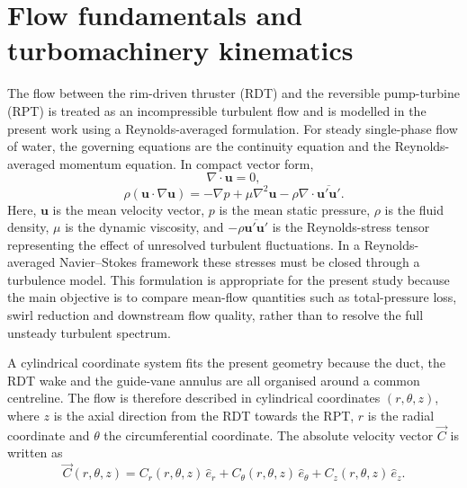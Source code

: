 \section{Flow fundamentals and turbomachinery kinematics}
\label{sec:theory_kinematics}

The flow between the rim-driven thruster (RDT) and the reversible pump-turbine (RPT) is treated as an incompressible turbulent flow and is modelled in the present work using a Reynolds-averaged formulation. For steady single-phase flow of water, the governing equations are the continuity equation and the Reynolds-averaged momentum equation. In compact vector form,
\begin{equation}
\nabla \cdot \mathbf{u} = 0,
\label{eq:continuity}
\end{equation}
\begin{equation}
\rho \left( \mathbf{u} \cdot \nabla \mathbf{u} \right)
=
-\nabla p
+ \mu \nabla^2 \mathbf{u}
- \rho \nabla \cdot \overline{\mathbf{u}'\mathbf{u}'}.
\label{eq:rans_momentum}
\end{equation}
Here, $\mathbf{u}$ is the mean velocity vector, $p$ is the mean static pressure, $\rho$ is the fluid density, $\mu$ is the dynamic viscosity, and $-\rho \overline{\mathbf{u}'\mathbf{u}'}$ is the Reynolds-stress tensor representing the effect of unresolved turbulent fluctuations. In a Reynolds-averaged Navier--Stokes framework these stresses must be closed through a turbulence model. This formulation is appropriate for the present study because the main objective is to compare mean-flow quantities such as total-pressure loss, swirl reduction and downstream flow quality, rather than to resolve the full unsteady turbulent spectrum.

A cylindrical coordinate system fits the present geometry because the duct, the RDT wake and the guide-vane annulus are all organised around a common centreline. The flow is therefore described in cylindrical coordinates $(r,\theta,z)$, where $z$ is the axial direction from the RDT towards the RPT, $r$ is the radial coordinate and $\theta$ the circumferential coordinate. The absolute velocity vector $\vec{C}$ is written as
\begin{equation}
\vec{C}(r,\theta,z)
=
C_r(r,\theta,z)\,\hat{e}_r
+
C_\theta(r,\theta,z)\,\hat{e}_\theta
+
C_z(r,\theta,z)\,\hat{e}_z.
\label{eq:cylindrical_velocity}
\end{equation}

